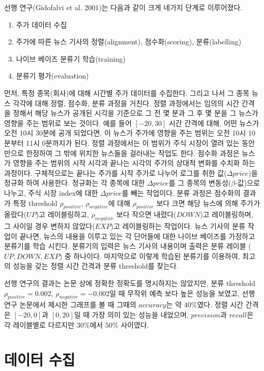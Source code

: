 \documentclass[a4paper,10pt]{article}
\begin{document}
선행 연구(Gidofalvi et al. 2001)는 다음과 같이 크게 네가지 단계로 이루어졌다.
\begin{enumerate}
\item 주가 데이터 수집
\item 주가에 따른 뉴스 기사의 정렬(alignment), 점수화(scoring), 분류(labelling)
\item 나이브 베이즈 분류기 학습(training)
\item 분류기 평가(evaluation)
\end{enumerate}
먼저, 특정 종목(회사)에 대해 시간별 주가 데이터를 수집한다.
그리고 나서 그 종목 뉴스 각각에 대해 정렬, 점수화, 분류 과정을 거친다.
정렬 과정에서는 임의의 시간 간격을 정해서 해당 뉴스가 공개된 시각을 기준으로 그 전 몇 분과 그 후 몇 분을 그 뉴스가 영향을 주는 범위로 보는 것이다.
예를 들어 $[-20, 30]$ 시간 간격에 대해, 어떤 뉴스가 오전 10시 30분에 공개 되었다면, 이 뉴스가 주가에 영향을 주는 범위는 오전 10시 10분부터 11시 0분까지가 된다.
정렬 과정에서는 이 범위가 주식 시장이 열려 있는 동안만으로 한정하여 그 밖에 위치한 뉴스들을 걸러내는 작업도 한다.
점수화 과정은 뉴스가 영향을 주는 범위의 시작 시각과 끝나는 시각의 주가의 상대적 변화를 수치화 하는 과정이다.
구체적으로는 끝나는 주가를 시작 주가로 나누어 로그를 취한 값($\Delta price$)을 정규화 하여 사용한다.
정규화는 각 종목에 대한 $\Delta price$를 그 종목의 변동성($\beta$-값)으로 나누고, 주식 시장 index에 대한 $\Delta price$를 빼는 작업이다.
분류 과정은 점수화의 결과가 특정 threshold $\rho_{positive}$, $\rho_{negative}$에 대해
$\rho_{positive}$ 보다 크면 해당 뉴스에 의해 주가가 올랐다($UP$)고 레이블링하고,
$\rho_{negative}$ 보다 작으면 내렸다($DOWN$)고 레이블링하며,
그 사이일 경우 변하지 않았다($EXP$)고 레이블링하는 작업이다.
뉴스 기사의 분류 작업이 끝나면, 뉴스의 내용을 이루고 있는 각 단어들에 대한 나이브 베이즈를 가정하고 분류기를 학습 시킨다.
분류기의 입력은 뉴스 기사의 내용이며 출력은 분류 레이블 ($UP, DOWN, EXP$) 중 하나이다.
마지막으로 이렇게 학습된 분류기를 이용하여, 최고의 성능을 갖는 정렬 시간 간격과 분류 threshold를 찾는다.

선행 연구의 결과는 논문 상에 정확한 정확도를 명시하지는 않았지만,
분류 threshold $\rho_{positive}=0.002$, $\rho_{negative}=-0.002$일 때 무작위 예측 보다 높은 성능을 보였고,
선행 연구 논문에서 제시한 그래프를 볼 때 그때의 $accuracy$는 약 $40\%$였다.
정렬 시간 간격은 $[-20,0]$과 $[0,20]$일 때 가장 의미 있는 성능을 내었으며,
$precision$과 $recall$은 각 레이블별로 다르지만 $30\%$에서 $50\%$ 사이였다.

\section{데이터 수집}
\end{document}
